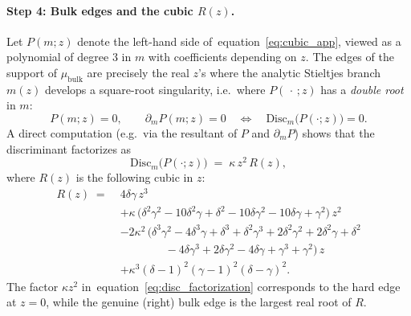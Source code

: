 \documentclass{article}
\def\eqref#1{equation~\ref{#1}}
\begin{document}
\paragraph{Step 4: Bulk edges and the cubic $R(z)$.}
Let $P(m;z)$ denote the left-hand side of~\eqref{eq:cubic_app}, viewed as a polynomial of degree $3$ in $m$ with coefficients depending on $z$. The edges of the support of $\mu_{\mathrm{bulk}}$ are precisely the real $z$'s where the analytic Stieltjes branch $m(z)$ develops a square-root singularity, i.e.\ where $P(\,\cdot\,;z)$ has a \emph{double root} in $m$:
\[
    P(m;z)=0, \qquad \partial_m P(m;z)=0
    \quad\Longleftrightarrow\quad
    \mathrm{Disc}_m\!\big(P(\cdot;z)\big)=0.
\]
A direct computation (e.g.\ via the resultant of $P$ and $\partial_m P$) shows that the discriminant factorizes as
\begin{equation}\label{eq:disc_factorization}
    \mathrm{Disc}_m\big(P(\cdot;z)\big) \;=\; \kappa\,z^2\,R(z),
\end{equation}
where $R(z)$ is the following cubic in $z$:
\begin{align}
    R(z) \;=\;& 4\delta\gamma\, z^3 \nonumber\\
    &+ \kappa\,\Big(\delta^2\gamma^2 - 10\delta^2\gamma + \delta^2 - 10\delta\gamma^2 - 10\delta\gamma + \gamma^2\Big)\,z^2 \nonumber\\
    &- 2\kappa^2\,\Big(\delta^3\gamma^2 - 4\delta^3\gamma + \delta^3 + \delta^2\gamma^3 + 2\delta^2\gamma^2 + 2\delta^2\gamma + \delta^2 \nonumber\\
    &\qquad\qquad - 4\delta\gamma^3 + 2\delta\gamma^2 - 4\delta\gamma + \gamma^3 + \gamma^2\Big)\, z \nonumber\\
    &+ \kappa^3(\delta-1)^2(\gamma-1)^2(\delta-\gamma)^2.
    \label{eq:Rcubic}
\end{align}
The factor $\kappa z^2$ in~\eqref{eq:disc_factorization} corresponds to the hard edge at $z=0$, while the genuine (right) bulk edge is the largest real root of $R$.
\end{document}
